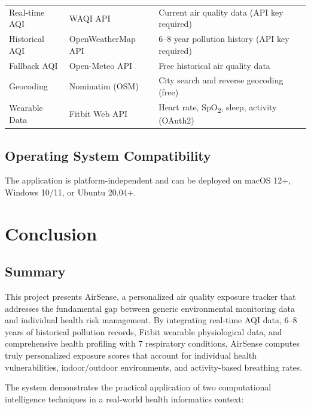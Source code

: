 \documentclass[12pt,a4paper]{report}
\begin{document}
\begin{table}[H]
\begin{tabularx}{\textwidth}{llX}
\midrule
Real-time AQI    & WAQI API               & Current air quality data (API key required) \\
Historical AQI   & OpenWeatherMap API     & 6--8 year pollution history (API key required) \\
Fallback AQI     & Open-Meteo API         & Free historical air quality data \\
Geocoding        & Nominatim (OSM)        & City search and reverse geocoding (free) \\
Wearable Data    & Fitbit Web API         & Heart rate, SpO\textsubscript{2}, sleep, activity (OAuth2) \\
\bottomrule
\end{tabularx}
\end{table}

\section{Operating System Compatibility}

The application is platform-independent and can be deployed on macOS 12+, Windows 10/11, or Ubuntu 20.04+.


\chapter{Conclusion}

\section{Summary}

This project presents AirSense, a personalized air quality exposure tracker that addresses the fundamental gap between generic environmental monitoring data and individual health risk management. By integrating real-time AQI data, 6--8 years of historical pollution records, Fitbit wearable physiological data, and comprehensive health profiling with 7 respiratory conditions, AirSense computes truly personalized exposure scores that account for individual health vulnerabilities, indoor/outdoor environments, and activity-based breathing rates.

The system demonstrates the practical application of two computational intelligence techniques in a real-world health informatics context:
\end{document}

